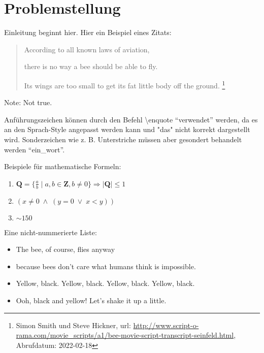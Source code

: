 \chapter{Problemstellung}

Einleitung beginnt hier. 
Hier ein Beispiel eines Zitats:
\begin{quote}
According to all known laws
of aviation,

there is no way a bee
should be able to fly.

Its wings are too small to get
its fat little body off the ground.
\footnote{
Simon Smith und Steve Hickner, 
url: \url{http://www.script-o-rama.com/movie_scripts/a1/bee-movie-script-transcript-seinfeld.html}, 
Abrufdatum: 2022-02-18\cite{bee_movie}
}
\end{quote}
\vspace{-0.5cm} %
\begin{flushright}
{\footnotesize Note: Not true.} 
\end{flushright}

Anführungszeichen können durch den Befehl \textbackslash{}enquote \enquote{verwendet} werden, da es an den Sprach-Style angepasst werden kann und "das" nicht korrekt dargestellt wird.
Sonderzeichen wie z. B. Unterstriche müssen aber gesondert behandelt werden \enquote{ein\_wort}.

Beispiele für mathematische Formeln:
\begin{enumerate}
    \item $\mathbf{Q} = \{{\frac{a}{b}} \mid a,b \in \mathbf{Z} , b \neq 0\}
        \Rightarrow |\mathbf{Q}| \leq 1$
    \item $(x \neq 0 \; \land \; (y = 0 \; \lor \; x < y))$
    \item $\sim150$
\end{enumerate}

\clearpage %

Eine nicht-nummerierte Liste:
\begin{itemize}
    \setlength{\itemsep}{5pt}
    \setlength{\parskip}{0pt}
    \setlength{\parsep}{0pt}
    \item The bee, of course, flies anyway
    \item because bees don't care what humans think is impossible.
    \item Yellow, black. Yellow, black. Yellow, black. Yellow, black.
    \item Ooh, black and yellow! Let's shake it up a little.
\end{itemize}


